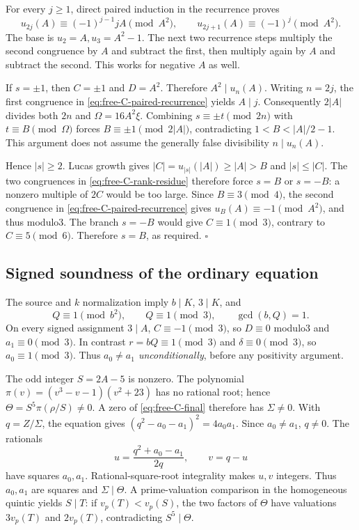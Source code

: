 For every $j\ge1$, direct paired induction in the recurrence proves
\begin{equation}\label{eq:free-C-paired-recurrence}
 u_{2j}(A)\equiv(-1)^{j-1}jA\pmod{A^2},\qquad
 u_{2j+1}(A)\equiv(-1)^j\pmod{A^2}.
\end{equation}
The base is $u_2=A,u_3=A^2-1$. The next two recurrence steps multiply the
second congruence by $A$ and subtract the first, then multiply again by $A$
and subtract the second. This works for negative $A$ as well.

If $s=\pm1$, then $C=\pm1$ and $D=A^2$. Therefore $A^2\mid u_n(A)$.
Writing $n=2j$, the first congruence in
\eqref{eq:free-C-paired-recurrence} yields $A\mid j$.
Consequently $2|A|$ divides both $2n$ and
$\Omega=16A^2\xi$. Combining $s\equiv\pm t\pmod{2n}$ with
$t\equiv B\pmod\Omega$ forces $B\equiv\pm1\pmod{2|A|}$,
contradicting $1<B<|A|/2-1$.
This argument does not assume the generally false divisibility $n\mid u_n(A)$.

Hence $|s|\ge2$. Lucas growth gives
$|C|=u_{|s|}(|A|)\ge|A|>B$ and $|s|\le|C|$.
The two congruences in \eqref{eq:free-C-rank-residue} therefore force
$s=B$ or $s=-B$: a nonzero multiple of $2C$ would be too large.
Since $B\equiv3\pmod4$, the second congruence in
\eqref{eq:free-C-paired-recurrence} gives $u_B(A)\equiv-1\pmod{A^2}$,
and thus modulo3. The branch $s=-B$ would give $C\equiv1\pmod3$,
contrary to $C\equiv5\pmod6$. Therefore $s=B$, as required.
\hfill$\square$

\subsection{Signed soundness of the ordinary equation}

The source and $k$ normalization imply $b\mid K$, $3\mid K$, and
\[
 Q\equiv1\pmod{b^2},\qquad Q\equiv1\pmod3,\qquad \gcd(b,Q)=1.
\]
On every signed assignment $3\mid A$, $C\equiv-1\pmod3$, so $D\equiv0$
modulo3 and $a_1\equiv0\pmod3$. In contrast $r=bQ\equiv1\pmod3$ and
$\delta\equiv0\pmod3$, so $a_0\equiv1\pmod3$. Thus
\emph{$a_0\ne a_1$ unconditionally}, before any positivity argument.

The odd integer $S=2A-5$ is nonzero. The polynomial
$\pi(v)=(v^3-v-1)(v^2+23)$ has no rational root; hence
$\Theta=S^5\pi(\rho/S)\ne0$. A zero of
\eqref{eq:free-C-final} therefore has $\Sigma\ne0$. With $q=Z/\Sigma$,
the equation gives $(q^2-a_0-a_1)^2=4a_0a_1$.
Since $a_0\ne a_1$, $q\ne0$. The rationals
\[
 u=\frac{q^2+a_0-a_1}{2q},\qquad v=q-u
\]
have squares $a_0,a_1$. Rational-square-root integrality makes $u,v$
integers. Thus $a_0,a_1$ are squares and $\Sigma\mid\Theta$.
A prime-valuation comparison in the homogeneous quintic yields $S\mid T$:
if $v_p(T)<v_p(S)$, the two factors of $\Theta$ have valuations
$3v_p(T)$ and $2v_p(T)$, contradicting $S^5\mid\Theta$.

